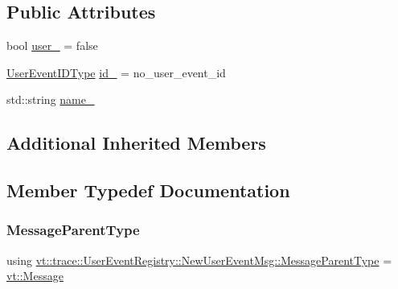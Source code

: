 \subsection*{Public Attributes}
\begin{DoxyCompactItemize}
\item 
bool \hyperlink{structvt_1_1trace_1_1_user_event_registry_1_1_new_user_event_msg_a6317d5623c1edcce684641fe0115824c}{user\+\_\+} = false
\item 
\hyperlink{namespacevt_1_1trace_a5908920d051c144c89f17c69ed262350}{User\+Event\+I\+D\+Type} \hyperlink{structvt_1_1trace_1_1_user_event_registry_1_1_new_user_event_msg_a6e1f863bc07f7edc7e869de47d725acf}{id\+\_\+} = no\+\_\+user\+\_\+event\+\_\+id
\item 
std\+::string \hyperlink{structvt_1_1trace_1_1_user_event_registry_1_1_new_user_event_msg_a6189fab0f945cd51f56aed0ebcd14ed6}{name\+\_\+}
\end{DoxyCompactItemize}
\subsection*{Additional Inherited Members}


\subsection{Member Typedef Documentation}
\mbox{\label{structvt_1_1trace_1_1_user_event_registry_1_1_new_user_event_msg_afbb15e38d855c994e71f19e77194eda7}} 
\subsubsection{\texorpdfstring{Message\+Parent\+Type}{MessageParentType}}
{\footnotesize\ttfamily using \hyperlink{structvt_1_1trace_1_1_user_event_registry_1_1_new_user_event_msg_afbb15e38d855c994e71f19e77194eda7}{vt\+::trace\+::\+User\+Event\+Registry\+::\+New\+User\+Event\+Msg\+::\+Message\+Parent\+Type} =  \hyperlink{namespacevt_a3a3ddfef40b4c90915fa43cdd5f129ea}{vt\+::\+Message}}



